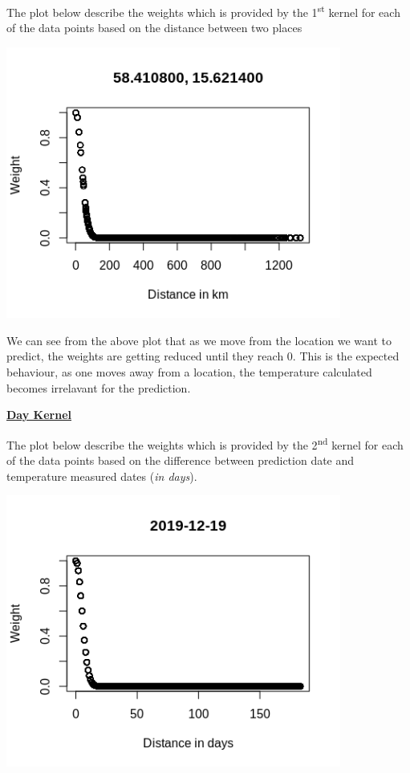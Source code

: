 \documentclass[a4paper,10pt]{article}
\begin{document}
The plot below describe the weights which is provided by the 1\textsuperscript{st} kernel for each of the data points based on the distance between two places \par
\begin{center}
  \includegraphics[width=110mm,scale=0.10]{Weights_Distance.png}
\end{center}
We can see from the above plot that as we move from the location we want to predict, the weights are getting reduced until they reach 0. This is the expected behaviour,
as one moves away from a location, the temperature calculated becomes irrelavant for the prediction. \par
\textbf{\underline{Day Kernel}} \par
The plot below describe the weights which is provided by the 2\textsuperscript{nd} kernel for each of the data points based on the difference between prediction date and
temperature measured dates (\textit{in days}).
\begin{center}
  \includegraphics[width=110mm,scale=0.10]{Weights_Day.png}
\end{center} 
\end{document}
